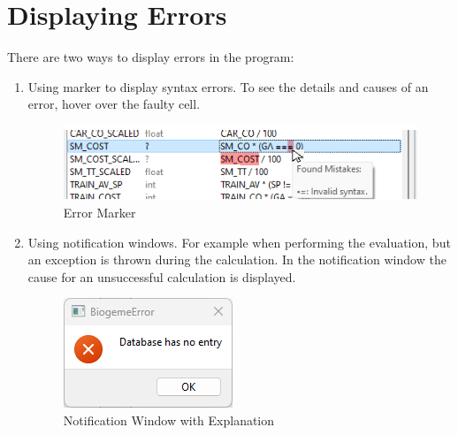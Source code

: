 \documentclass{article}
\begin{document}
\section{Displaying Errors}
There are two ways to display errors in the program:
\begin{enumerate} [label=\arabic*.]
    \item Using marker to display syntax errors. To see the details and causes of an error, hover over the faulty cell. \\
    \begin{figure} [H]
        \centering
        \includegraphics[width = 8 cm]{docs/User Manual/img/marker.png}
        \caption{Error Marker}
        \label{fig:marker}
    \end{figure}
    \item Using notification windows. For example when performing the evaluation, but an exception is thrown during the calculation. In the notification window the cause for an unsuccessful calculation is displayed.
    \begin{figure} [H]
        \centering
        \includegraphics[width = 5 cm]{docs/User Manual/img/exception.png}
        \caption{Notification Window with Explanation}
        \label{fig:exception}
    \end{figure}
\end{enumerate}
\end{document}
